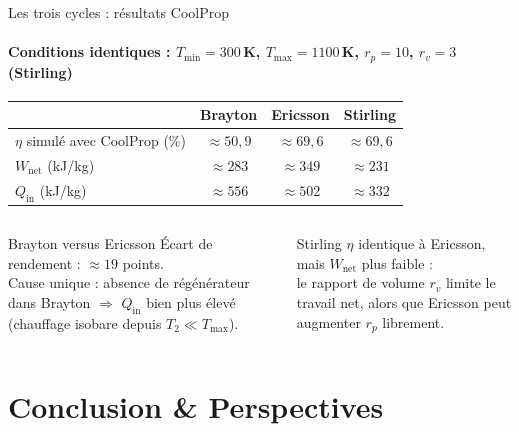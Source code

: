 \documentclass[aspectratio=43, 10pt]{beamer}
\newcommand{\Tmin}{T_{\min}}
\newcommand{\Tmax}{T_{\max}}
\newcommand{\Wnet}{W_{\text{net}}}
\newcommand{\Qin}{Q_{\text{in}}}
\begin{document}
\begin{frame}{Les trois cycles : r\'esultats CoolProp}
  \framesubtitle{Conditions identiques :
    $\Tmin=300$\,K, $\Tmax=1100$\,K, $r_p=10$, $r_v=3$ (Stirling)}

  \begin{center}\small
  \renewcommand{\arraystretch}{1.2}
  \begin{tabular}{lccc}
    \toprule
    & \textbf{Brayton} & \textbf{Ericsson} & \textbf{Stirling} \\
    \midrule
    $\eta$ simul\'e avec CoolProp (\%)
      & $\approx 50{,}9$ & $\approx 69{,}6$ & $\approx 69{,}6$ \\
    $\Wnet$ (kJ/kg)
      & $\approx 283$ & $\approx 349$ & $\approx 231$ \\
    $\Qin$ (kJ/kg)
      & $\approx 556$ & $\approx 502$ & $\approx 332$ \\
    \bottomrule
  \end{tabular}
  \end{center}

  \vspace{0.6em}
  \begin{columns}[T,onlytextwidth]
      \begin{alertblock}{Brayton versus Ericsson}
        \small
        \'Ecart de rendement : $\approx 19$ points.\\[3pt]
        Cause unique : absence de r\'eg\'en\'erateur
        dans Brayton $\Rightarrow$ $\Qin$ bien plus \'elev\'e
        (chauffage isobare depuis $T_2 \ll \Tmax$).
      \end{alertblock}

      \begin{exampleblock}{Stirling}
        \small
        $\eta$ identique \`a Ericsson,
        mais $\Wnet$ plus faible :\\[2pt]
        le rapport de volume $r_v$ limite
        le travail net, alors que
        Ericsson peut augmenter $r_p$
        librement.
      \end{exampleblock}
  \end{columns}

\end{frame}

\section{Conclusion \& Perspectives}
\end{document}
